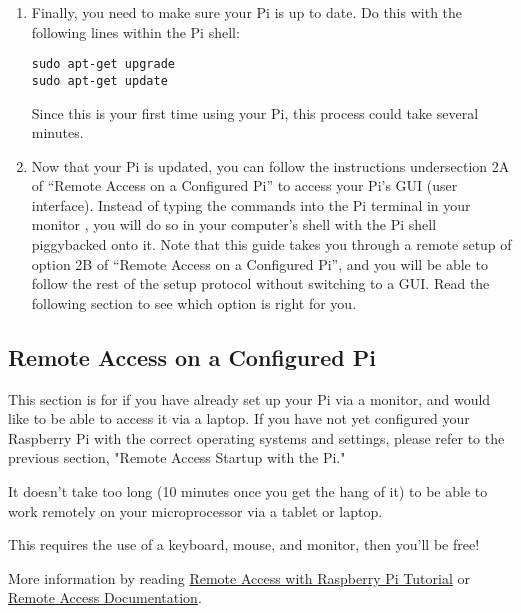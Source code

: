 \documentclass{article}\usepackage[]{graphicx}\usepackage[]{color}
\begin{document}
\begin{enumerate}
\item Finally, you need to make sure your Pi is up to date.  Do this with the following lines within the Pi shell:
\begin{lstlisting}
sudo apt-get upgrade
sudo apt-get update
\end{lstlisting}
Since this is your first time using your Pi, this process could take several minutes.

\item Now that your Pi is updated, you can follow the instructions undersection 2A of ``Remote Access on a Configured Pi'' to access your Pi's GUI (user interface).  Instead of typing the commands into the Pi terminal in your monitor , you will do so in your computer's shell with the Pi shell piggybacked onto it.  Note that this guide takes you through a remote setup of option 2B of ``Remote Access on a Configured Pi'', and you will be able to follow the rest of the setup protocol without switching to a GUI.  Read the following section to see which option is right for you.

\end{enumerate}


\subsection{Remote Access on a Configured Pi}

This section is for if you have already set up your Pi via a monitor, and would like to be able to access it via a laptop.  If you have not yet configured your Raspberry Pi with the correct operating systems and settings, please refer to the previous section, "Remote Access Startup with the Pi."

It doesn't take too long (10 minutes once you get the hang of it) to be able to work remotely on your microprocessor via a tablet or laptop.  

This requires the use of a keyboard, mouse, and monitor, then you'll be free!

More information by reading \href{https://pythonprogramming.net/remote-access-raspberry-pi-tutorials/?completed=/introduction-raspberry-pi-tutorials/}{Remote Access with Raspberry Pi Tutorial} or \href{https://www.raspberrypi.org/documentation/remote-access/ip-address.md}{Remote Access Documentation}.
\end{document}

